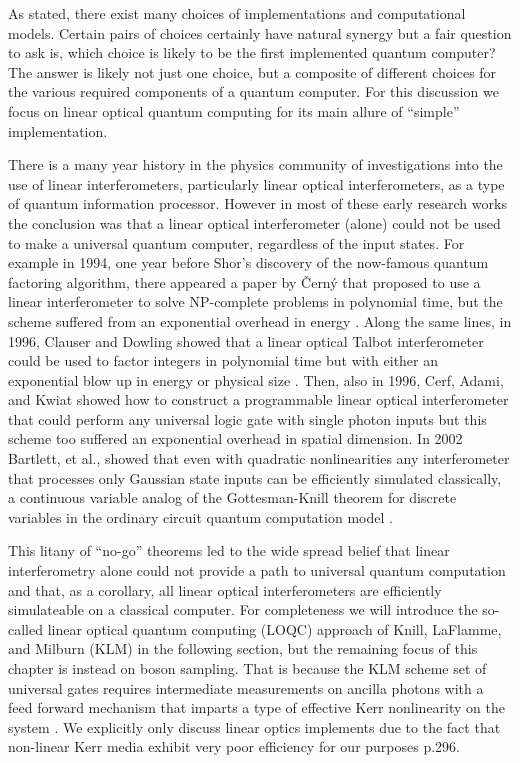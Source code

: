\documentclass[aps,pra,twocolumn,amsmath,amssymb,nofootinbib,superscriptaddress]{revtex4}
\begin{document}
	As stated, there exist many choices of implementations and computational models. Certain pairs of choices certainly have natural synergy but a fair question to ask is, which choice is likely to be the first implemented quantum computer? The answer is likely not just one choice, but a composite of different choices for the various required components of a quantum computer. For this discussion we focus on linear optical quantum computing for its main allure of ``simple'' implementation.

	There is a many year history in the physics community of investigations into the use of linear interferometers, particularly linear optical interferometers, as a type of quantum information processor. However in most of these early research works the conclusion was that a linear optical interferometer (alone) could not be used to make a universal quantum computer, regardless of the input states. For example in 1994, one year before Shor’s discovery of the now-famous quantum factoring algorithm, there appeared a paper by Černý that proposed to use a linear interferometer to solve NP-complete problems in polynomial time, but the scheme suffered from an exponential overhead in energy \cite{cerny}. Along the same lines, in 1996, Clauser and Dowling showed that a linear optical Talbot interferometer could be used to factor integers in polynomial time but with either an exponential blow up in energy or physical size \cite{clauser}. Then, also in 1996, Cerf, Adami, and Kwiat showed how to construct a programmable linear optical interferometer that could perform any universal logic gate with single photon inputs but this scheme too suffered an exponential overhead in spatial dimension. In 2002 Bartlett, et al., showed that even with quadratic nonlinearities any interferometer that processes only Gaussian state inputs can be efficiently simulated classically, a continuous variable analog of the Gottesman-Knill theorem for discrete variables in the ordinary circuit quantum computation model \cite{bart}. 

	This litany of ``no-go'' theorems led to the wide spread belief that linear interferometry alone could not provide a path to universal quantum computation and that, as a corollary, all linear optical interferometers are efficiently simulateable on a classical computer. For completeness we will introduce the so-called linear optical quantum computing (LOQC) approach of Knill, LaFlamme, and Milburn (KLM) \cite{knill,kok} in the following section, but the remaining focus of this chapter is instead on boson sampling. That is because the KLM scheme set of universal gates requires intermediate measurements on ancilla photons with a feed forward mechanism that imparts a type of effective Kerr nonlinearity on the system \cite{lap}. We explicitly only discuss linear optics implements due to the fact that non-linear Kerr media exhibit very poor efficiency for our purposes \cite{nielsen} p.296.
\end{document}
